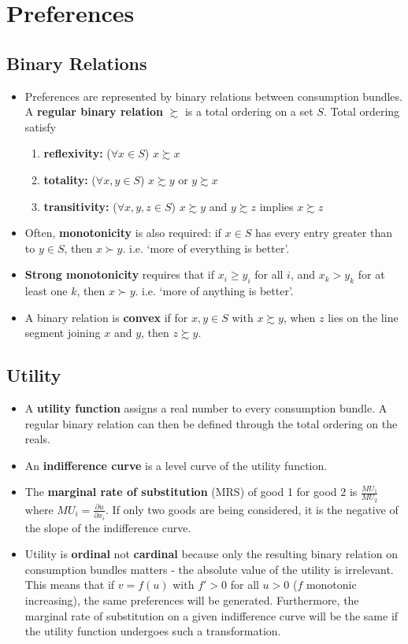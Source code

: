\documentclass[a4paper]{article}
\begin{document}
\section{Preferences}
\subsection{Binary Relations}
\begin{itemize}
    \item Preferences are represented by binary relations between consumption bundles. A \textbf{regular binary relation} $\succsim$ is a total ordering on a set $S$. Total ordering satisfy
    \begin{enumerate}
        \item \textbf{reflexivity:} ($\forall x \in S$) $x \succsim x$
        \item \textbf{totality:} ($\forall x, y \in S$) $x \succsim y$ or $y \succsim x$
        \item \textbf{transitivity:} ($\forall x, y, z \in S$) $x \succsim y$ and $y \succsim z$ implies $x \succsim z$
    \end{enumerate}
    \item Often, \textbf{monotonicity} is also required: if $x \in S$ has every entry greater than to $y \in S$, then $x \succ y$. i.e. `more of everything is better'.
    \item \textbf{Strong monotonicity} requires that if $x_i \geq y_i$ for all $i$, and $x_k > y_k$ for at least one $k$, then $x \succ y$. i.e. `more of anything is better'.
    \item A binary relation is \textbf{convex} if for $x, y \in S$ with $x \succsim y$, when $z$ lies on the line segment joining $x$ and $y$, then $z \succsim y$.
\end{itemize}

\subsection{Utility}
\begin{itemize}
    \item A \textbf{utility function} assigns a real number to every consumption bundle. A regular binary relation can then be defined through the total ordering on the reals.
    \item An \textbf{indifference curve} is a level curve of the utility function.
    \item The \textbf{marginal rate of substitution} (MRS) of good 1 for good 2 is $\frac{MU_1}{MU_2}$ where $MU_i = \frac{\partial u}{\partial x_i}$. If only two goods are being considered, it is the negative of the slope of the indifference curve.
    \item Utility is \textbf{ordinal} not \textbf{cardinal} because only the resulting binary relation on consumption bundles matters - the absolute value of the utility is irrelevant. This means that if $v = f(u)$ with $f' > 0$ for all $u > 0$ ($f$ monotonic increasing), the same preferences will be generated. Furthermore, the marginal rate of substitution on a given indifference curve will be the same if the utility function undergoes such a transformation. 
\end{itemize}
\end{document}
